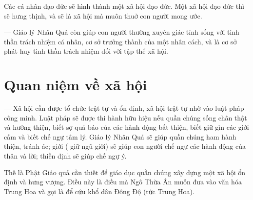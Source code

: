 Các cá nhân đạo đức sẽ hình thành một xã hội đạo đức. Một xã hội đạo đức thì sẽ hưng thịnh, và sẽ là xã hội mà muôn thuở con người mong ước.

— Giáo lý Nhân Quả còn giúp con người thường xuyên giác tỉnh sống với tinh thần trách nhiệm cá nhân, cơ sở trưởng thành của một nhân cách, và là cơ sở phát huy tinh thần trách nhiệm đối với tập thể xã hội.

\section{Quan niệm về xã hội} %
\label{sec:87_xa_hoi}

— Xã hội cần được tổ chức trật tự và ổn định, xã hội trật tự nhờ vào luật pháp công minh. Luật pháp sẽ được thi hành hữu hiệu nếu quần chúng sống chân thật và hướng thiện, biết sợ quả báo của các hành động bất thiện, biết giữ gìn các giới cấm và biết chế ngự tâm lý. Giáo lý Nhân Quả sẽ giúp quần chúng ham hành thiện, tránh ác; giới ( giữ ngũ giới) sẽ giúp con người chế ngự các hành động của thân và lời; thiền định sẽ giúp chế ngự ý.

Thế là Phật Giáo quả cần thiết để giáo dục quần chúng xây dựng một xã hội ổn định và hưng vượng. Điều này là điều mà Ngô Thừa Ân muốn đưa vào văn hóa Trung Hoa và gọi là để cứu khổ dân Đông Độ (tức Trung Hoa).

